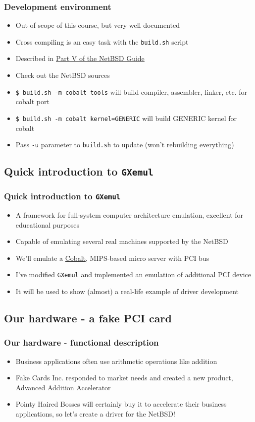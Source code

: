 \documentclass[dvipsnames,table]{beamer}
\begin{document}
\begin{frame}
\frametitle{Development environment}
\begin{itemize}
	\item Out of scope of this course, but very well documented
	\item Cross compiling is an easy task with the {\tt build.sh} script
	\item Described in \href{http://www.netbsd.org/docs/guide/en/part-compile.html}{Part V of the NetBSD Guide}
	\item Check out the NetBSD sources
	\item {\tt \$ build.sh -m cobalt tools} will build compiler, assembler, linker, etc. for cobalt port
	\item {\tt \$ build.sh -m cobalt kernel=GENERIC} will build GENERIC kernel for cobalt
	\item Pass {\tt -u} parameter to {\tt build.sh} to update (won't rebuilding everything)
\end{itemize}
\end{frame}

\subsection{Quick introduction to {\tt GXemul}}

\begin{frame}
\frametitle{Quick introduction to {\tt GXemul}}
\begin{itemize}
	\item A framework for full-system computer architecture emulation, excellent for educational purposes
	\item Capable of emulating several real machines supported by the NetBSD
	\item We'll emulate a \href{http://en.wikipedia.org/wiki/Cobalt_Qube}{Cobalt}, MIPS-based micro server with PCI bus
	\item I've modified {\tt GXemul} and implemented an emulation of additional PCI device
	\item It will be used to show (almost) a real-life example of driver development
\end{itemize}
\end{frame}

\subsection{Our hardware - a fake PCI card}

\begin{frame}
\frametitle{Our hardware - functional description}
\begin{itemize}
	\item Business applications often use arithmetic operations like addition
	\item Fake Cards Inc. responded to market needs and created a new product, Advanced Addition Accelerator
	\item Pointy Haired Bosses will certainly buy it to accelerate their business applications, so let's create a driver for the NetBSD!
\end{itemize}
\end{frame}
\end{document}

